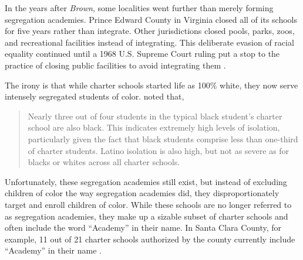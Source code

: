 In the years after \textit{Brown}, some localities went further than merely forming segregation academies. Prince Edward County in Virginia closed all of its schools for five years rather than integrate. Other jurisdictions closed pools, parks, zoos, and recreational facilities instead of integrating. This deliberate evasion of racial equality continued until a 1968 U.S. Supreme Court ruling put a stop to the practice of closing public facilities to avoid integrating them \parencite{Brennan1968}.

The irony is that while charter schools started life as 100\% white, they now serve intensely segregated students of color. \textcite[47]{Frankenberg.etal2019} noted that,
\blockquote[][]{\SingleSpacing\vspace{-0.5\baselineskip}%
Nearly three out of four students in the typical black student's charter school are also black. This indicates extremely high levels of isolation, particularly given the fact that black students comprise less than one-third of charter students. Latino isolation is also high, but not as severe as for blacks or whites across all charter schools.}

Unfortunately, these segregation academies still exist, but instead of excluding children of color the way segregation academies did, they disproportionately target and enroll children of color. While these schools are no longer referred to as segregation academies, they make up a sizable subset of charter schools and often include the word ``Academy'' in their name. In Santa Clara County, for example, 11 out of 21 charter schools authorized by the county currently include ``Academy'' in their name \parencite{SCCOE2023}.

